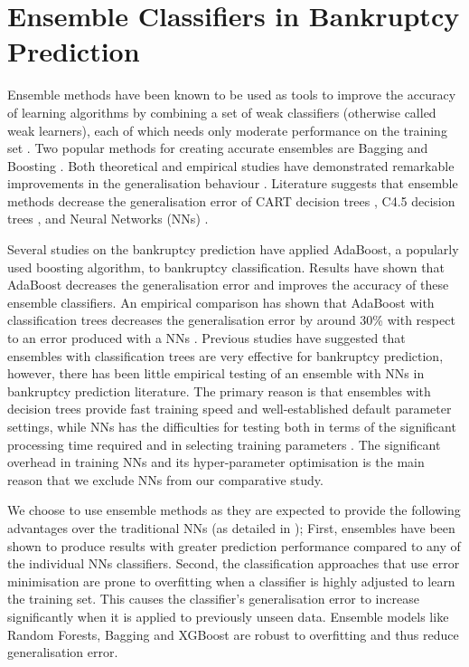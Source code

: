 \section{Ensemble Classifiers in Bankruptcy Prediction}
Ensemble methods have been known to be used as tools to improve the accuracy of learning algorithms by combining a set of weak classifiers (otherwise called weak learners), each of which needs only moderate performance on the training set \cite{perrone1994putting,schapire1990strength}. Two popular methods for creating accurate ensembles are Bagging \cite{breiman1996bagging} and Boosting \cite{freund1996experiments}. Both theoretical and empirical studies have demonstrated remarkable improvements in the generalisation behaviour \cite{bauer1999empirical,friedman2000additive}. Literature suggests that ensemble methods decrease the generalisation error of CART decision trees \cite{breiman1996bagging}, C4.5 decision trees \cite{quinlan1987simplifying}, and Neural Networks (NNs) \cite{opitz1999popular}.

Several studies on the bankruptcy prediction have applied AdaBoost, a popularly used boosting algorithm, to bankruptcy classification. Results have shown that AdaBoost decreases the generalisation error and improves the accuracy \cite{cortes2007multiclass} of these ensemble classifiers. An empirical comparison has shown that AdaBoost with classification trees decreases the generalisation error by around 30\%  with respect to an error produced with a NNs \cite{alfaro2008bankruptcy}. 
Previous studies have suggested that ensembles with classification trees are very effective for bankruptcy prediction, however, there has been little empirical testing of an ensemble with NNs in bankruptcy prediction literature. The primary reason is that ensembles with decision trees provide fast training speed and well-established default parameter settings, while NNs has the difficulties for testing both in terms of the significant processing time required and in selecting training parameters \cite{opitz1999popular}.
The significant overhead in training NNs and its hyper-parameter optimisation is the main reason that we exclude NNs from our comparative study.

We choose to use ensemble methods as they are expected to provide the following advantages over the traditional NNs (as detailed in \cite{kim2010ensemble}); 
First, ensembles have been shown to produce results with greater prediction performance compared to any of the individual NNs classifiers.
Second, the classification approaches that use error minimisation are prone to overfitting when a classifier is highly adjusted to learn the training set. This causes the classifier’s generalisation error to increase significantly when it is applied to previously unseen data. 
Ensemble models like Random Forests, Bagging and XGBoost are robust to overfitting and thus reduce generalisation error. 

